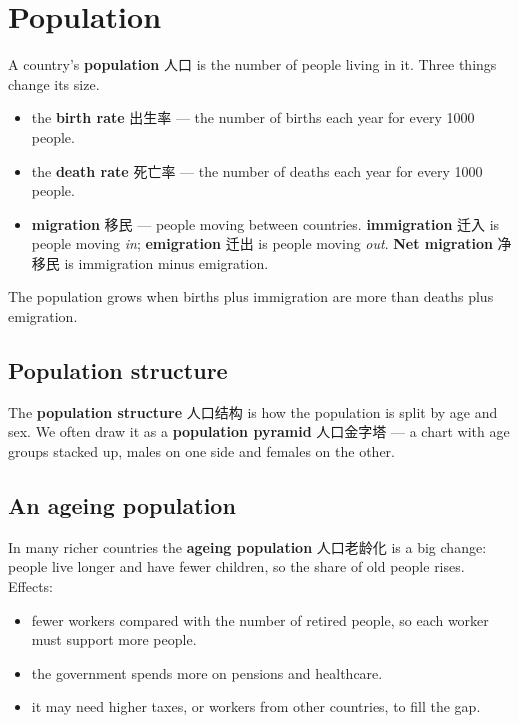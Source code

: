 \documentclass[11pt]{article}
\begin{document}
\section*{Population}

A country's \textbf{population} 人口 is the number of people living in it. Three things change its size.

\begin{itemize}
\item the \textbf{birth rate} 出生率 — the number of births each year for every 1000 people.

\item the \textbf{death rate} 死亡率 — the number of deaths each year for every 1000 people.

\item \textbf{migration} 移民 — people moving between countries. \textbf{immigration} 迁入 is people moving \emph{in}; \textbf{emigration} 迁出 is people moving \emph{out}. \textbf{Net migration} 净移民 is immigration minus emigration.

\end{itemize}

The population grows when births plus immigration are more than deaths plus emigration.

\subsection*{Population structure}

The \textbf{population structure} 人口结构 is how the population is split by age and sex. We often draw it as a \textbf{population pyramid} 人口金字塔 — a chart with age groups stacked up, males on one side and females on the other.

\subsection*{An ageing population}

In many richer countries the \textbf{ageing population} 人口老龄化 is a big change: people live longer and have fewer children, so the share of old people rises. Effects:

\begin{itemize}
\item fewer workers compared with the number of retired people, so each worker must support more people.

\item the government spends more on pensions and healthcare.

\item it may need higher taxes, or workers from other countries, to fill the gap.

\end{itemize}
\end{document}
